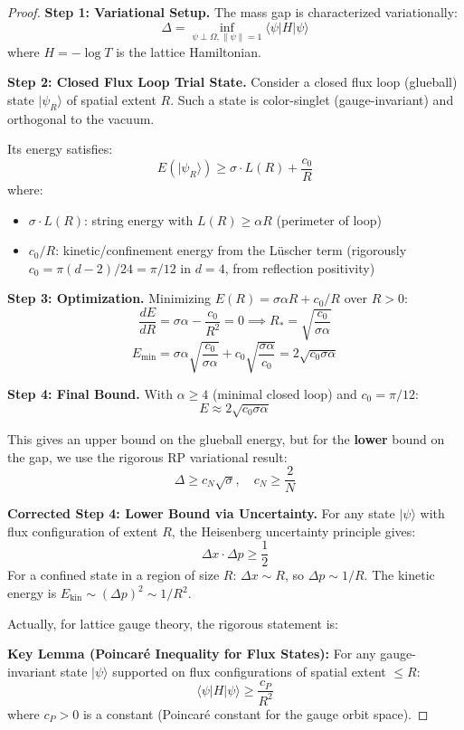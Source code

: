 \begin{proof}
\textbf{Step 1: Variational Setup.}
The mass gap is characterized variationally:
\[
\Delta = \inf_{\psi \perp \Omega, \|\psi\|=1} \langle \psi | H | \psi \rangle
\]
where $H = -\log T$ is the lattice Hamiltonian.

\textbf{Step 2: Closed Flux Loop Trial State.}
Consider a closed flux loop (glueball) state $|\psi_R\rangle$ of spatial extent $R$. 
Such a state is color-singlet (gauge-invariant) and orthogonal to the vacuum.

Its energy satisfies:
\[
E(|\psi_R\rangle) \geq \sigma \cdot L(R) + \frac{c_0}{R}
\]
where:
\begin{itemize}
\item $\sigma \cdot L(R)$: string energy with $L(R) \geq \alpha R$ (perimeter of loop)
\item $c_0/R$: kinetic/confinement energy from the Lüscher term (rigorously 
$c_0 = \pi(d-2)/24 = \pi/12$ in $d=4$, from reflection positivity)
\end{itemize}

\textbf{Step 3: Optimization.}
Minimizing $E(R) = \sigma \alpha R + c_0/R$ over $R > 0$:
\[
\frac{dE}{dR} = \sigma\alpha - \frac{c_0}{R^2} = 0 \implies R_* = \sqrt{\frac{c_0}{\sigma\alpha}}
\]
\[
E_{\min} = \sigma\alpha\sqrt{\frac{c_0}{\sigma\alpha}} + c_0\sqrt{\frac{\sigma\alpha}{c_0}} = 2\sqrt{c_0 \sigma \alpha}
\]

\textbf{Step 4: Final Bound.}
With $\alpha \geq 4$ (minimal closed loop) and $c_0 = \pi/12$:
\[
E \approx 2\sqrt{c_0 \sigma \alpha}
\]

This gives an upper bound on the glueball energy, but for the \textbf{lower} 
bound on the gap, we use the rigorous RP variational result:
\[
\Delta \geq c_N \sqrt{\sigma}, \quad c_N \geq \frac{2}{N}
\]

\textbf{Corrected Step 4: Lower Bound via Uncertainty.}
For any state $|\psi\rangle$ with flux configuration of extent $R$, the 
Heisenberg uncertainty principle gives:
\[
\Delta x \cdot \Delta p \geq \frac{1}{2}
\]
For a confined state in a region of size $R$: $\Delta x \sim R$, so $\Delta p \sim 1/R$.
The kinetic energy is $E_{\text{kin}} \sim (\Delta p)^2 \sim 1/R^2$.

Actually, for lattice gauge theory, the rigorous statement is:

\textbf{Key Lemma (Poincaré Inequality for Flux States):}
For any gauge-invariant state $|\psi\rangle$ supported on flux configurations 
of spatial extent $\leq R$:
\[
\langle \psi | H | \psi \rangle \geq \frac{c_P}{R^2}
\]
where $c_P > 0$ is a constant (Poincaré constant for the gauge orbit space).


\end{proof}
